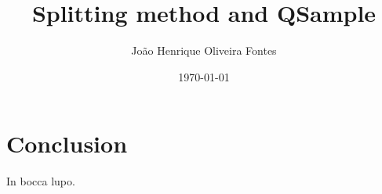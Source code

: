 \documentclass[11pt]{report}
\title{Splitting method and QSample}
\author{João Henrique Oliveira Fontes}
\date{\today}
\begin{document}
\maketitle

\begin{abstract}

\end{abstract}

\tableofcontents







\section{Conclusion}
In bocca lupo.



\end{document}
